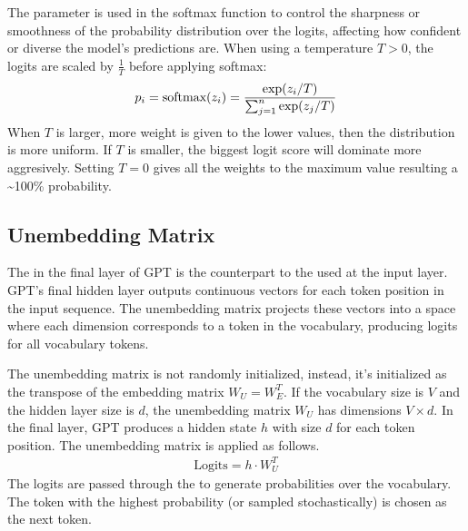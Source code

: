 \documentclass[letterpaper,11pt,english]{sphinxmanual}
\begin{document}
\sphinxAtStartPar
The  parameter is used in the softmax function to control
the sharpness or smoothness of the probability distribution over the
logits, affecting how confident or diverse the model’s predictions are.
When using a temperature \(T > 0\), the logits are scaled by
\(\frac{1}{T}\) before applying softmax:
\begin{equation*}
\begin{split}p_i = \text{softmax}(z_i) = {\exp(z_i/T)\over \sum^n_{j=1}\exp(z_j/T)}\end{split}
\end{equation*}
\sphinxAtStartPar
When \(T\) is larger, more weight is given to the lower values, then
the distribution is more uniform. If \(T\) is smaller, the biggest
logit score will dominate more aggresively. Setting \(T=0\) gives
all the weights to the maximum value resulting a \textasciitilde{}100\% probability.


\subsection{Unembedding Matrix}
\label{\detokenize{pretraining:unembedding-matrix}}
\sphinxAtStartPar
The  in the final layer of GPT is the counterpart
to the  used at the input layer. GPT’s final hidden
layer outputs continuous vectors for each token position in the input
sequence. The unembedding matrix projects these vectors into a space
where each dimension corresponds to a token in the vocabulary, producing
logits for all vocabulary tokens.

\sphinxAtStartPar
The unembedding matrix is not randomly initialized, instead, it’s
initialized as the transpose of the embedding matrix
\(W_U = W_E^T\). If the vocabulary size is \(V\) and the hidden
layer size is \(d\), the unembedding matrix \(W_U\) has
dimensions \(V \times d\). In the final layer, GPT produces a hidden
state \(h\) with size \(d\) for each token position. The
unembedding matrix is applied as follows.
\begin{equation*}
\begin{split}\text{Logits} = h \cdot W_U^T\end{split}
\end{equation*}
\sphinxAtStartPar
The logits are passed through the  to generate
probabilities over the vocabulary. The token with the highest
probability (or sampled stochastically) is chosen as the next token.
\end{document}
